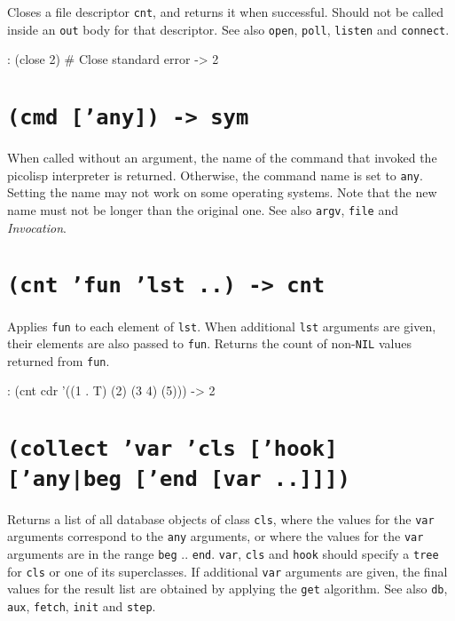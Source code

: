 Closes a file descriptor \texttt{cnt}, and returns it when successful. Should
not be called inside an \texttt{out} body for that descriptor. See also \texttt{open},
\texttt{poll}, \texttt{listen} and \texttt{connect}.


\begin{wideverbatim}
: (close 2)                            # Close standard error
-> 2
\end{wideverbatim}

 
\section*{\texttt{(cmd ['any]) -> sym}}
\label{sec:funct-rec-C-(cmd-['any])-->-sym}


When called without an argument, the name of the command that invoked
the picolisp interpreter is returned. Otherwise, the command name is set
to \texttt{any}. Setting the name may not work on some operating systems. Note
that the new name must not be longer than the original one. See also
\texttt{argv}, \texttt{file} and \emph{Invocation}.



 
\section*{\texttt{(cnt 'fun 'lst ..) -> cnt}}
\label{sec:funct-rec-C-(cnt-'fun-'lst-..)-->-cnt}


Applies \texttt{fun} to each element of \texttt{lst}. When additional \texttt{lst} arguments
are given, their elements are also passed to \texttt{fun}. Returns the count of
non-\texttt{NIL} values returned from \texttt{fun}.


\begin{wideverbatim}
: (cnt cdr '((1 . T) (2) (3 4) (5)))
-> 2
\end{wideverbatim}

 
\section*{\texttt{(collect 'var 'cls ['hook] ['any|beg ['end [var ..]]])}}
\label{sec:funct-rec-C-(collect-'var-'cls-['hook]-['any|beg-['end-[var-..]]])}


Returns a list of all database objects of class \texttt{cls}, where the values
for the \texttt{var} arguments correspond to the \texttt{any} arguments, or where the
values for the \texttt{var} arguments are in the range \texttt{beg} .. \texttt{end}. \texttt{var},
\texttt{cls} and \texttt{hook} should specify a \texttt{tree} for \texttt{cls} or one of its
superclasses. If additional \texttt{var} arguments are given, the final values
for the result list are obtained by applying the \texttt{get} algorithm. See
also \texttt{db}, \texttt{aux}, \texttt{fetch}, \texttt{init} and \texttt{step}.


